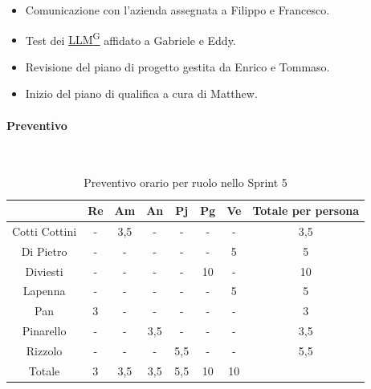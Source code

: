 \documentclass{article}
\begin{document}
\begin{itemize}
\begin{itemize}
                        \item Comunicazione con l'azienda assegnata a Filippo e Francesco.
                        \item Test dei \href{https://code7crusaders.github.io/docs/RTB/documentazione_interna/glossario.html#llm-large-language-model}{LLM\textsuperscript{G}} affidato a Gabriele e Eddy.
                        \item Revisione del piano di progetto gestita da Enrico e Tommaso.
                        \item Inizio del piano di qualifica a cura di Matthew.
                    \end{itemize}
                \end{itemize}

                \paragraph{Preventivo}\mbox{}\\
                \begin{table}[H]
                    \centering
                    \begin{tabular}{|c|c|c|c|c|c|c|c|}
                    \hline
                                  & Re  & Am  & An  & Pj  & Pg  & Ve  & Totale per persona \\ \hline
                    Cotti Cottini & -   & 3,5 & -   & -   & -   & -   & 3,5                \\ \hline
                    Di Pietro     & -   & -   & -   & -   & -   & 5   & 5                  \\ \hline
                    Diviesti      & -   & -   & -   & -   & 10  & -   & 10                 \\ \hline
                    Lapenna       & -   & -   & -   & -   & -   & 5   & 5                  \\ \hline
                    Pan           & 3   & -   & -   & -   & -   & -   & 3                  \\ \hline
                    Pinarello     & -   & -   & 3,5 & -   & -   & -   & 3,5                \\ \hline
                    Rizzolo       & -   & -   & -   & 5,5 & -   & -   & 5,5                \\ \hline
                    Totale        & 3   & 3,5 & 3,5 & 5,5 & 10  & 10  &                    \\ \hline
                    \end{tabular}
                    \caption{Preventivo orario per ruolo nello Sprint 5}
                \end{table}
\end{document}
